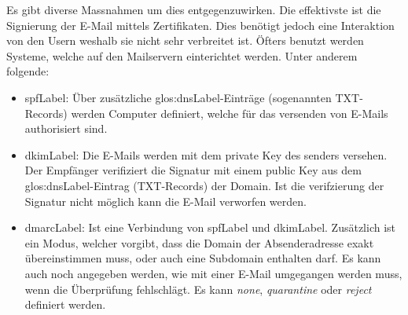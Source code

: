 Es gibt diverse Massnahmen um dies entgegenzuwirken. Die effektivste ist die Signierung der E-Mail mittels Zertifikaten. Dies benötigt jedoch eine Interaktion von den Usern weshalb sie nicht sehr verbreitet ist. Öfters benutzt werden Systeme, welche auf den Mailservern einterichtet werden. Unter anderem folgende:
\begin{itemize}
\item \Gls{spfLabel}: Über zusätzliche \gls{glos:dnsLabel}-Einträge (sogenannten TXT-Records) werden Computer definiert, welche für das versenden von E-Mails authorisiert sind.
\item \Gls{dkimLabel}: Die E-Mails werden mit dem private Key des senders versehen. Der Empfänger verifiziert die Signatur mit einem public Key aus dem \gls{glos:dnsLabel}-Eintrag (TXT-Records) der Domain. Ist die verifzierung der Signatur nicht möglich kann die E-Mail verworfen werden.
\item \Gls{dmarcLabel}: Ist eine Verbindung von \Gls{spfLabel} und \Gls{dkimLabel}. Zusätzlich ist ein Modus, welcher vorgibt, dass die Domain der Absenderadresse exakt übereinstimmen muss, oder auch eine Subdomain enthalten darf. Es kann auch noch angegeben werden, wie mit einer E-Mail umgegangen werden muss, wenn die Überprüfung fehlschlägt. Es kann \textit{none}, \textit{quarantine} oder \textit{reject} definiert werden.
\end{itemize}
